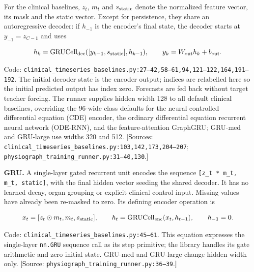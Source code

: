 For the clinical baselines, \(z_t\), \(m_t\) and \(s_{\rm static}\) denote the normalized feature vector, its mask and the static vector. Except for persistence, they share an autoregressive decoder: if \(h_{-1}\) is the encoder's final state, the decoder starts at \(y_{-1}=z_{C-1}\) and uses

\[
h_k=\operatorname{GRUCell}_{\rm dec}([y_{k-1},s_{\rm static}],h_{k-1}),\qquad
y_k=W_{\rm out}h_k+b_{\rm out}.
\]


Code: \texttt{clinical\_\allowbreak{}timeseries\_\allowbreak{}baselines.\allowbreak{}py:\allowbreak{}27–\allowbreak{}42,\allowbreak{}58–\allowbreak{}61,\allowbreak{}94,\allowbreak{}121–\allowbreak{}122,\allowbreak{}164,\allowbreak{}191–\allowbreak{}192}. The initial decoder state is the encoder output; indices are relabelled here so the initial predicted output has index zero. Forecasts are fed back without target teacher forcing. The runner supplies hidden width 128 to all default clinical baselines, overriding the 96-wide class defaults for the neural controlled differential equation (CDE) encoder, the ordinary differential equation recurrent neural network (ODE-RNN), and the feature-attention GraphGRU; GRU-med and GRU-large use widths 320 and 512. [Sources: \texttt{clinical\_\allowbreak{}timeseries\_\allowbreak{}baselines.\allowbreak{}py:\allowbreak{}103,\allowbreak{}142,\allowbreak{}173,\allowbreak{}204–\allowbreak{}207}; \texttt{physiograph\_\allowbreak{}training\_\allowbreak{}runner.\allowbreak{}py:\allowbreak{}31–\allowbreak{}40,\allowbreak{}130}.]

\textbf{GRU.} A single-layer gated recurrent unit encodes the sequence \texttt{[z\_\allowbreak{}t * m\_\allowbreak{}t,\allowbreak{} m\_\allowbreak{}t,\allowbreak{} static]}, with the final hidden vector seeding the shared decoder. It has no learned decay, organ grouping or explicit clinical control input. Missing values have already been re-masked to zero. Its defining encoder operation is

\[
x_t=[z_t\odot m_t,m_t,s_{\rm static}],\qquad
h_t=\operatorname{GRUCell}_{\rm enc}(x_t,h_{t-1}),\qquad h_{-1}=0.
\]


Code: \texttt{clinical\_\allowbreak{}timeseries\_\allowbreak{}baselines.\allowbreak{}py:\allowbreak{}45–\allowbreak{}61}. This equation expresses the single-layer \texttt{nn.\allowbreak{}GRU} sequence call as its step primitive; the library handles its gate arithmetic and zero initial state. GRU-med and GRU-large change hidden width only. [Source: \texttt{physiograph\_\allowbreak{}training\_\allowbreak{}runner.\allowbreak{}py:\allowbreak{}36–\allowbreak{}39}.]

